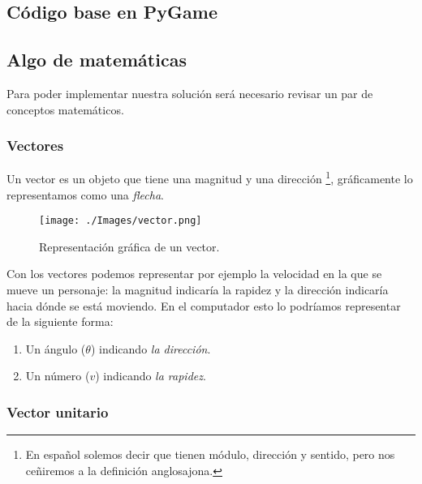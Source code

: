 \newpage
\clearpage

\subsection{Código base en PyGame}




\newpage 
\subsection{Algo de matemáticas}

Para poder implementar nuestra solución será necesario revisar un par de conceptos matemáticos. 

\subsubsection{Vectores}

Un vector es un objeto que tiene una magnitud y una dirección \cite{introVectors} \footnote{En español solemos decir que tienen módulo, dirección y sentido, pero nos ceñiremos a la definición anglosajona.}, gráficamente lo representamos como una \emph{flecha}.
 
 \begin{figure}[h!]
 	\centering
 	\texttt{[image: ./Images/vector.png]}
 	\caption{Representación gráfica de un vector.}
 	\label{vector}
 \end{figure}

Con los vectores podemos representar por ejemplo la velocidad en la que se mueve un personaje: la magnitud indicaría la rapidez y la dirección indicaría hacia dónde se está moviendo. En el computador esto lo podríamos representar de la siguiente forma:

\begin{enumerate}
\item Un ángulo ($\theta$) indicando \emph{la dirección}.

\item Un número ($v$) indicando \emph{la rapidez}.
\end{enumerate}


\subsubsection{Vector unitario}

